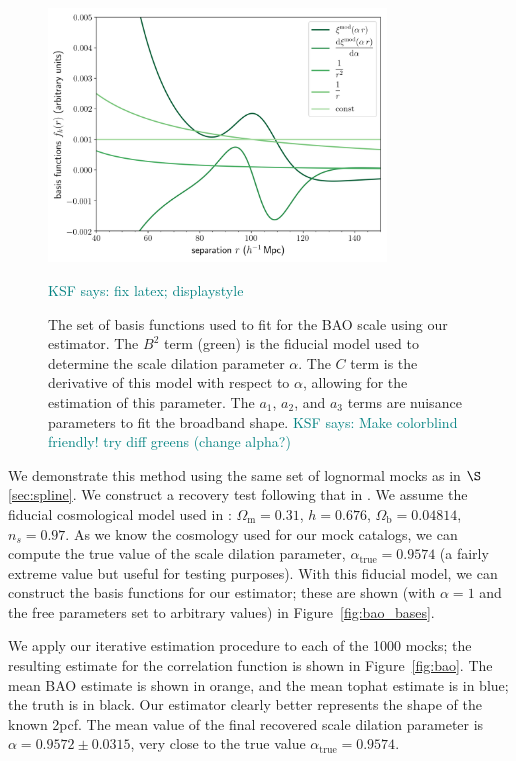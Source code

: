 \documentclass[modern]{aastex62}
\newcommand{\cf}{2pcf\xspace} %
\newcommand{\KSF}[1]{\textcolor{teal}{KSF says: #1}}
\begin{document}
\label{fig:bao_bases}
\begin{figure}[ht]
\centering
    \includegraphics[width=0.8\textwidth]{bao_bases}
    \caption{The set of basis functions used to fit for the BAO scale using our estimator. The $B^2$ term (green) is the fiducial model used to determine the scale dilation parameter $\alpha$. The $C$ term is the derivative of this model with respect to $\alpha$, allowing for the estimation of this parameter. The $a_1$, $a_2$, and $a_3$ terms are nuisance parameters to fit the broadband shape. \KSF{Make colorblind friendly! try diff greens (change alpha?)}} \KSF{fix latex; displaystyle}
\end{figure}

We demonstrate this method using the same set of lognormal mocks as in $\S$\ref{sec:spline}.
We construct a recovery test following that in \cite{Hinton2019}.
We assume the fiducial cosmological model used in \cite{Beutler2017}: $\Omega_{\text{m}} = 0.31$, $h = 0.676$, $\Omega_{\text{b}} = 0.04814$, $n_s = 0.97$. 
As we know the cosmology used for our mock catalogs, we can compute the true value of the scale dilation parameter, $\alpha_{\text{true}}=0.9574$ (a fairly extreme value but useful for testing purposes).
With this fiducial model, we can construct the basis functions for our estimator; these are shown (with $\alpha=1$ and the free parameters set to arbitrary values) in Figure~\ref{fig:bao_bases}.

We apply our iterative estimation procedure to each of the 1000 mocks; the resulting estimate for the correlation function is shown in Figure~\ref{fig:bao}.
The mean BAO estimate is shown in orange, and the mean tophat estimate is in blue; the truth is in black.
Our estimator clearly better represents the shape of the known \cf.
The mean value of the final recovered scale dilation parameter is $\alpha=0.9572 \pm 0.0315$, very close to the true value $\alpha_{\text{true}}=0.9574$.
\end{document}
